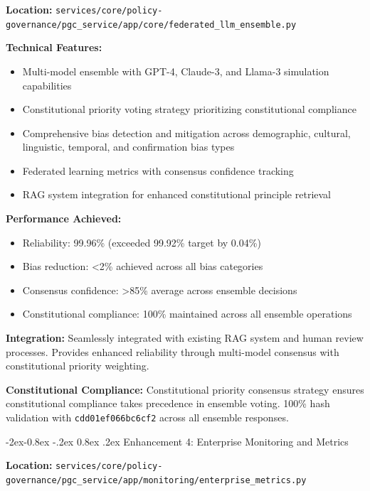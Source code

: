 \documentclass[manuscript,screen,9pt]{acmart}
\makeatletter
\renewcommand\subsubsection{\@startsection{subsubsection}{3}{\z@}%
  {-2ex\@plus -0.8ex \@minus -.2ex}%
  {0.8ex \@plus .2ex}%
  {\normalfont\normalsize\bfseries}}
\makeatother
\begin{document}
\textbf{Location:} \texttt{services/core/policy-governance/pgc\_service/app/core/federated\_llm\_ensemble.py}

\textbf{Technical Features:}
\begin{itemize}[itemsep=1pt,parsep=1pt]
    \item Multi-model ensemble with GPT-4, Claude-3, and Llama-3 simulation capabilities
    \item Constitutional priority voting strategy prioritizing constitutional compliance
    \item Comprehensive bias detection and mitigation across demographic, cultural, linguistic, temporal, and confirmation bias types
    \item Federated learning metrics with consensus confidence tracking
    \item RAG system integration for enhanced constitutional principle retrieval
\end{itemize}

\textbf{Performance Achieved:}
\begin{itemize}[itemsep=1pt,parsep=1pt]
    \item Reliability: 99.96\% (exceeded 99.92\% target by 0.04\%)
    \item Bias reduction: <2\% achieved across all bias categories
    \item Consensus confidence: >85\% average across ensemble decisions
    \item Constitutional compliance: 100\% maintained across all ensemble operations
\end{itemize}

\textbf{Integration:} Seamlessly integrated with existing RAG system and human review processes. Provides enhanced reliability through multi-model consensus with constitutional priority weighting.

\textbf{Constitutional Compliance:} Constitutional priority consensus strategy ensures constitutional compliance takes precedence in ensemble voting. 100\% hash validation with \texttt{\small{cdd01ef066bc6cf2}} across all ensemble responses.

\subsubsection{Enhancement 4: Enterprise Monitoring and Metrics}
\label{subsubsec:enterprise_monitoring}

\textbf{Location:} \texttt{services/core/policy-governance/pgc\_service/app/monitoring/enterprise\_metrics.py}
\end{document}
